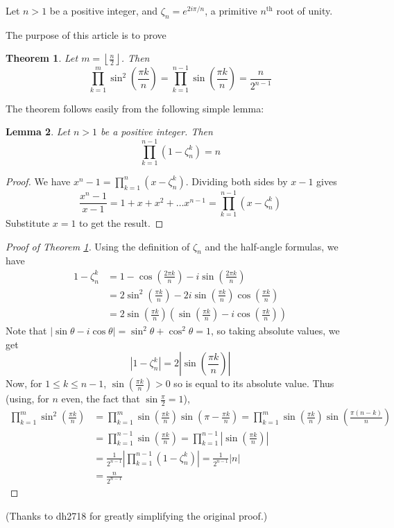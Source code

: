 \documentclass[12pt]{article}
\newtheorem{thm}{Theorem}
\newtheorem{lem}[thm]{Lemma}
\begin{document}
Let $n>1$ be a positive integer, and $\zeta_n=e^{2i\pi/n}$, a primitive $n^{\mathrm{th}}$ root of unity.

The purpose of this article is to prove
\begin{thm} \label{thm:one}Let $m=\left\lfloor\frac{n}{2}\right\rfloor$. Then
\begin{equation}
 \prod_{k=1}^m \sin^2\left(\frac{\pi k}{n}\right) = \prod_{k=1}^{n-1} \sin\left(\frac{\pi k}{n}\right) 
    = \frac{n}{2^{n-1}}
\end{equation}
\end{thm}

The theorem follows easily from the following simple lemma:
\begin{lem} Let $n>1$ be a positive integer. Then 
\[
  \prod_{k=1}^{n-1} (1-\zeta_n^k) = n
\]
\end{lem}
\begin{proof}
We have $x^n-1 = \prod_{k=1}^n (x-\zeta_n^k)$. Dividing both sides by $x-1$ gives
\[
  \frac{x^n-1}{x-1} = 1+x+x^2+\dots x^{n-1} = \prod_{k=1}^{n-1} (x-\zeta_n^k)
\]
Substitute $x=1$ to get the result.
\end{proof}

\begin{proof} [Proof of Theorem \ref{thm:one}]
Using the definition of $\zeta_n$ and the half-angle formulas, we have
\begin{align*}
  1-\zeta_n^k &= 1-\cos\left(\frac{2\pi k}{n}\right) - i\sin\left(\frac{2\pi k}{n}\right) \\
              &= 2\sin^2\left(\frac{\pi k}{n}\right) - 
                   2i\sin\left(\frac{\pi k}{n}\right)\cos\left(\frac{\pi k}{n}\right) \\
              &= 2\sin\left(\frac{\pi k}{n}\right)
                   \left(\sin\left(\frac{\pi k}{n}\right)-i\cos\left(\frac{\pi k}{n}\right)\right)
\end{align*}
Note that $\lvert \sin\theta - i\cos\theta\rvert = \sin^2\theta + \cos^2\theta=1$, so taking absolute values, we get
\[
  \left\lvert 1-\zeta_n^k\right\rvert = 2\left\lvert \sin\left(\frac{\pi k}{n}\right)\right\rvert
\]
Now, for $1\leq k\leq n-1$, $\sin\left(\frac{\pi k}{n}\right) > 0$ so is equal to its absolute value. Thus (using, for $n$ even, the fact that $\sin\frac{\pi}{2}=1$),
\begin{align*}
  \prod_{k=1}^m \sin^2\left(\frac{\pi k}{n}\right)
     &= \prod_{k=1}^m \sin\left(\frac{\pi k}{n}\right) \sin\left(\pi - \frac{\pi k}{n}\right) 
      = \prod_{k=1}^m \sin\left(\frac{\pi k}{n}\right) \sin\left(\frac{\pi(n-k)}{n}\right) \\
     &= \prod_{k=1}^{n-1} \sin\left(\frac{\pi k}{n}\right) 
      = \prod_{k=1}^{n-1} \left\lvert\sin\left(\frac{\pi k}{n}\right)\right\rvert \\
     &= \frac{1}{2^{n-1}}\left\lvert \prod_{k=1}^{n-1} (1-\zeta_n^k)\right\rvert
      = \frac{1}{2^{n-1}} \left\lvert n\right\rvert \\
     &= \frac{n}{2^{n-1}}
\end{align*}
\end{proof}

(Thanks to dh2718 for greatly simplifying the original proof.)
\end{document}

